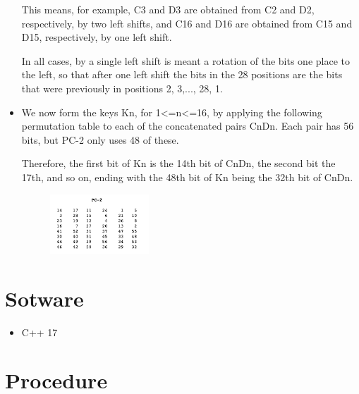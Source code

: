 \documentclass[fleqn, journal, onecolumn]{IEEEtran}             %
\theoremstyle{break}                                            %
\begin{document}
\begin{itemize}
          \cite{page}


          This means, for example, C3 and D3 are obtained from C2 and D2, respectively, by two left shifts, 
          and C16 and D16 are obtained from C15 and D15, respectively, by one left shift. 
          
          In all cases, by a single left shift is meant a rotation of the bits one place to the left, 
          so that after one left shift the bits in the 28 positions are the bits that were previously 
          in positions 2, 3,..., 28, 1.


          \item We now form the keys Kn, for 1<=n<=16, by applying the following permutation table 
          to each of the concatenated pairs CnDn. Each pair has 56 bits, but PC-2 only uses 48 of these.

          Therefore, the first bit of Kn is the 14th bit of CnDn, the second bit the 17th, and so on, 
          ending with the 48th bit of Kn being the 32th bit of CnDn.

          \begin{figure}[h]
            \includegraphics[width=0.35\textwidth]{PC2}
          \end{figure}

        \end{itemize}
      
  \section{Sotware}

    \begin{itemize}
      \item C++ 17  \cite{Cpp}
    \end{itemize}

  \section{Procedure}
\end{document}
